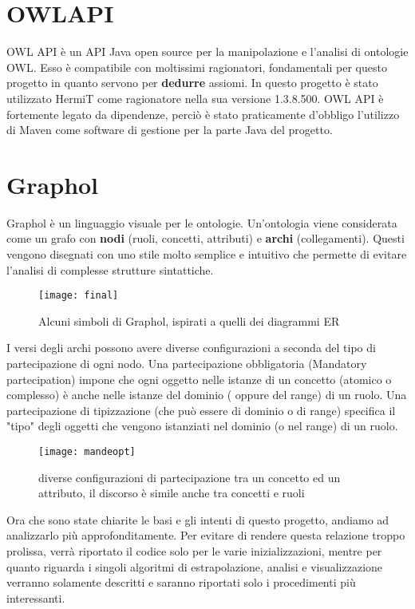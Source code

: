 \documentclass[Lau,binding=0.6cm]{sapthesis}
\begin{document}
\section{OWLAPI}
OWL API è un API Java open source per la manipolazione e l'analisi di ontologie OWL. Esso è compatibile con moltissimi ragionatori, fondamentali per questo progetto in quanto servono per \textbf{dedurre} assiomi. In questo progetto è stato utilizzato HermiT come ragionatore nella sua versione 1.3.8.500. OWL API è fortemente legato da dipendenze, perciò è stato praticamente d'obbligo l'utilizzo di Maven come software di gestione per la parte Java del progetto. 

\section{Graphol}
Graphol è un linguaggio visuale per le ontologie. Un'ontologia viene considerata come un grafo con \textbf{nodi} (ruoli, concetti, attributi) e \textbf{archi} (collegamenti). Questi vengono disegnati con uno stile molto semplice e intuitivo che permette di evitare l'analisi di complesse strutture sintattiche.

\begin{figure}[H]
\centering
\texttt{[image: final]}\\[3ex]
\caption{Alcuni simboli di Graphol, ispirati a quelli dei diagrammi ER}
\label{fig:largenenough}
\end{figure}
I versi degli archi possono avere diverse configurazioni a seconda del tipo di partecipazione di ogni nodo.
Una partecipazione obbligatoria (Mandatory partecipation) impone che ogni oggetto nelle istanze di un concetto (atomico o complesso) è anche nelle istanze del dominio ( oppure del range) di un ruolo. Una partecipazione di tipizzazione (che può essere di dominio o di range) specifica il "tipo" degli oggetti che vengono istanziati nel dominio (o nel range) di un ruolo.
\begin{figure}[H]
\centering
\texttt{[image: mandeopt]}\\[3ex]
\caption{diverse configurazioni di partecipazione tra un concetto ed un attributo, il discorso è simile anche tra concetti e ruoli}
\label{fig:largenenough}
\end{figure}
Ora che sono state chiarite le basi e gli intenti di questo progetto, andiamo ad analizzarlo più approfonditamente. Per evitare di rendere questa relazione troppo prolissa, verrà riportato il codice solo per le varie inizializzazioni, mentre per quanto riguarda i singoli algoritmi di estrapolazione, analisi e visualizzazione verranno solamente descritti e saranno riportati solo i procedimenti più interessanti.
\end{document}
